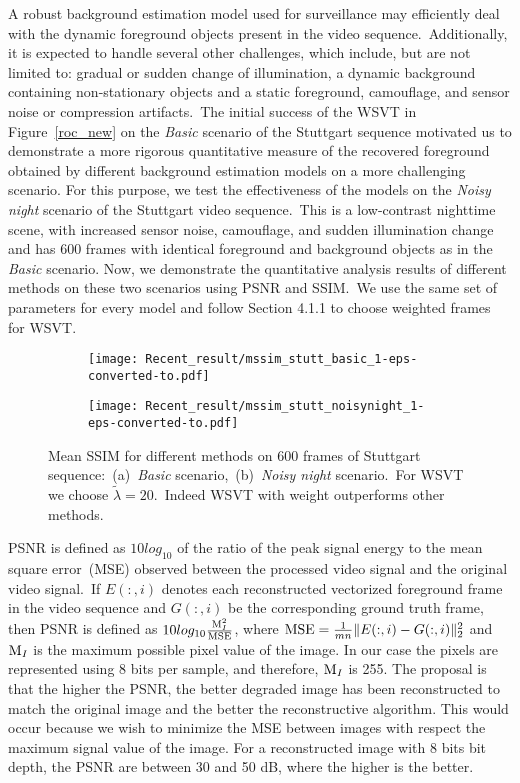 \documentclass[twoside,11pt]{article}
\begin{document}
A robust background estimation model used for surveillance may efficiently deal with the dynamic foreground objects present in the video sequence.~Additionally, it is expected to handle several other challenges, which include, but are not limited to: gradual or sudden change of illumination, a dynamic background containing non-stationary objects and a static foreground, camouflage, and sensor noise or compression artifacts.~The initial success of the WSVT in Figure~\ref{roc_new} on the {\it Basic} scenario of the Stuttgart sequence motivated us to demonstrate a more rigorous quantitative measure of the recovered foreground obtained by different background estimation models on a more challenging scenario. For this purpose, we test the effectiveness of the models on the {\it Noisy night} scenario of the Stuttgart video sequence.~This is a low-contrast nighttime scene, with increased sensor noise, camouflage, and sudden illumination change and has 600 frames with identical foreground and background objects as in the {\it Basic} scenario. Now, we demonstrate the quantitative analysis results of different methods on these two scenarios using PSNR and SSIM.~We use the same set of parameters for every model and follow Section 4.1.1 to choose weighted frames for WSVT. 
\begin{figure}
	\centering
	\begin{subfigure}[b]{0.55\textwidth}
		\texttt{[image: Recent\_result/mssim\_stutt\_basic\_1-eps-converted-to.pdf]}
		\caption{}
	\end{subfigure}%
	\begin{subfigure}[b]{0.55\textwidth}
		\texttt{[image: Recent\_result/mssim\_stutt\_noisynight\_1-eps-converted-to.pdf]}
		\caption{}
	\end{subfigure}
	\caption{Mean SSIM for different methods on 600 frames of Stuttgart sequence:~(a)~{\it Basic} scenario,~(b)~{\it Noisy night} scenario.~For WSVT we choose $\tilde{\lambda}=20$.~Indeed WSVT with weight outperforms other methods.}\label{mssim}
\end{figure}

PSNR is defined as $10log_{10}$ of the ratio of the peak signal energy to the mean square error~(MSE) observed between the processed video signal and the original video signal.~If $E(:,i)$ denotes each reconstructed vectorized foreground frame in the video sequence and $G(:,i)$ be the corresponding ground truth frame, then PSNR is defined as $10log_{10}\frac{{\rm M}_I^2}{{\rm MSE}}$, where ${\rm MSE}= \frac{1}{mn}\|E(:,i)-G(:,i)\|_2^2$ and ${\rm M}_I$ is the maximum possible pixel value of the image. In our case the pixels are represented using 8 bits per sample, and therefore, ${\rm M}_I$ is 255. The proposal is that the higher the PSNR, the better degraded image has been reconstructed to match the original image and the better the reconstructive algorithm.  This would occur because we wish to minimize the MSE between images with respect the maximum signal value of the image. For a reconstructed image with 8 bits bit depth, the PSNR are between 30 and 50 dB, where the higher is the better.
\end{document}
